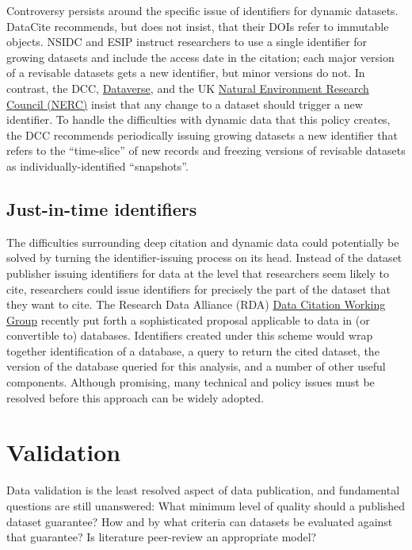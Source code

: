 \documentclass[10pt,a4paper,twocolumn]{article}
\begin{document}
{{Controversy persists around the specific issue of identifiers for dynamic datasets. 
DataCite recommends, but does not insist, that their DOIs refer to immutable objects.
NSIDC and ESIP instruct researchers to use a single identifier for growing datasets and include the access date in the citation; each major version of a revisable datasets gets a new identifier, but minor versions do not.
In contrast, the DCC, \href{http://thedata.org/}{Dataverse}, and the UK \href{http://www.nerc.ac.uk/}{Natural Environment Research Council (NERC)} insist that any change to a dataset should trigger a new identifier\cite{ball_how_2012,altman_proposed_2007,sarah_callaghan_making_2012}.
To handle the difficulties with dynamic data that this policy creates, the DCC recommends periodically issuing growing datasets a new identifier that refers to the ``time-slice'' of new records and freezing versions of revisable datasets as individually-identified ``snapshots''.

\subsection*{Just-in-time identifiers}\label{just-in-time-identifiers}

The difficulties surrounding deep citation and dynamic data could potentially be solved by turning the identifier-issuing process on its head.
Instead of the dataset publisher issuing identifiers for data at the level that researchers seem likely to cite, researchers could issue identifiers for precisely the part of the dataset that they want to cite.
The Research Data Alliance (RDA) \href{http://rd-alliance.org/working-groups/data-citation-wg.html}{Data Citation Working Group} recently put forth a sophisticated proposal applicable to data in (or convertible to) databases.
Identifiers created under this scheme would wrap together identification of a database, a query to return the cited dataset, the version of the database queried for this analysis, and a number of other useful components.
Although promising, many technical and policy issues must be resolved before this approach can be widely adopted.


\section*{Validation}\label{validation}

Data validation is the least resolved aspect of data publication, and fundamental questions are still unanswered:
What minimum level of quality should a published dataset guarantee?
How and by what criteria can datasets be evaluated against that guarantee?
Is literature peer-review an appropriate model?

}}
\end{document}
